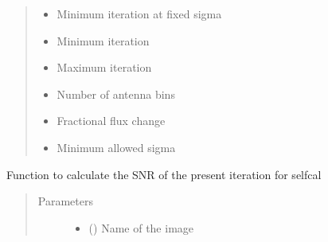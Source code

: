 \documentclass[letterpaper,10pt,english]{sphinxmanual}
\begin{document}
\begin{fulllineitems}
\begin{fulllineitems}
\begin{quote}
\begin{description}
\begin{itemize}
\end{itemize}

\item[{Returns}] \leavevmode
\sphinxAtStartPar
\begin{itemize}
\item {} 
\sphinxAtStartPar
{} \textendash{} Minimum iteration at fixed sigma

\item {} 
\sphinxAtStartPar
{} \textendash{} Minimum iteration

\item {} 
\sphinxAtStartPar
{} \textendash{} Maximum iteration

\item {} 
\sphinxAtStartPar
{} \textendash{} Number of antenna bins

\item {} 
\sphinxAtStartPar
{} \textendash{} Fractional flux change

\item {} 
\sphinxAtStartPar
{} \textendash{} Minimum allowed sigma

\end{itemize}


\end{description}\end{quote}

\end{fulllineitems}


\begin{fulllineitems}
\label{\detokenize{paircars:paircars.intensity_selfcal_LTS.IntensitySelfcal.calc_selfcal_snr}}
\sphinxAtStartPar
Function to calculate the SNR of the present iteration for selfcal
\begin{quote}\begin{description}
\item[{Parameters}] \leavevmode\begin{itemize}
\item {} 
\sphinxAtStartPar
{} () \textendash{} Name of the image


\end{itemize}
\end{description}
\end{quote}
\end{fulllineitems}
\end{fulllineitems}
\end{document}
